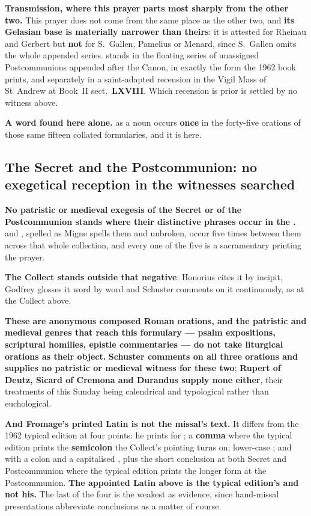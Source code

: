 \textbf{Transmission, where this prayer parts most sharply from the other
two.} This prayer does not come from the same place as the other two, and
\textbf{its Gelasian base is materially narrower than theirs}: it is attested
for Rheinau and Gerbert but \textbf{not} for S.~Gallen, Pamelius or Menard,
since S.~Gallen omits the whole appended series. 
stands in the floating series of unassigned Postcommunions appended after the
Canon, in exactly the form the 1962 book prints, and separately in a
saint-adapted recension in the Vigil Mass of St~Andrew at Book~II
sect.~\textbf{LXVIII}. Which recension is prior is settled by no witness above.

\textbf{A word found here alone.}  as a noun
occurs \textbf{once} in the forty-five orations of those same fifteen collated
formularies, and it is here.

\subsection*{The Secret and the Postcommunion: no exegetical reception in the witnesses searched}

\textbf{No patristic or medieval exegesis of the Secret  or of the Postcommunion  stands
where their distinctive phrases occur in the .}
 and , spelled
as Migne spells them and unbroken, occur five times between them across that whole
collection, and every one of the five is a sacramentary printing the
prayer.

\textbf{The Collect stands outside that negative}: Honorius cites it by
incipit, Godfrey glosses it word by word and Schuster comments on it
continuously, as at the Collect above.

\textbf{These are anonymous composed Roman orations, and the patristic and
medieval genres that reach this formulary --- psalm expositions, scriptural
homilies, epistle commentaries --- do not take liturgical orations as their
object.} \textbf{Schuster comments on all three orations and supplies no
patristic or medieval witness for these two}; \textbf{Rupert of Deutz, Sicard of
Cremona and Durandus supply none either}, their treatments of this Sunday being
calendrical and typological rather than euchological.

\textbf{And Fromage's printed Latin is not the missal's text.} It differs from
the 1962 typical edition at four points: he prints
 for ; a \textbf{comma} where the typical edition
prints the \textbf{semicolon} the Collect's pointing turns on;
lower-case ; and  with a
colon and a capitalised , plus the short conclusion  at both Secret and Postcommunion where the typical edition prints the
longer form at the Postcommunion. \textbf{The appointed Latin above is the typical
edition's and not his.} The last of the four is the weakest as evidence, since hand-missal
presentations abbreviate conclusions as a matter of course.
